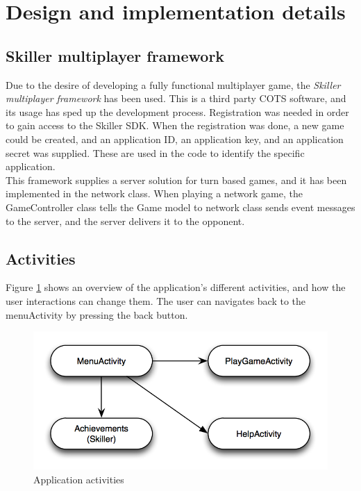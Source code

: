 \section{Design and implementation details}

\subsection{Skiller multiplayer framework}
Due to the desire of developing a fully functional multiplayer game, the \emph{Skiller multiplayer framework} \cite{skiller} has been used. This is a third party COTS software, and its usage has sped up the development process. Registration was needed in order to gain access to the Skiller SDK. When the registration was done, a new game could be created, and an application ID, an application key, and an application secret was supplied. These are used in the code to identify the specific application. \\

This framework supplies a server solution for turn based games, and it has been implemented in the network class. When playing a network game, the GameController class tells the Game model to  network class sends event messages to the server, and the server delivers it to the opponent.

\pagebreak
\subsection{Activities}
Figure \ref{fig:activities} shows an overview of the application's different activities, and how the user interactions can change them. The user can navigates back to the menuActivity by pressing the back button.\\

\begin{figure}[H]
\includegraphics[width=1\textwidth]{Images/activities}
\caption{Application activities}
\label{fig:activities}
\end{figure}


